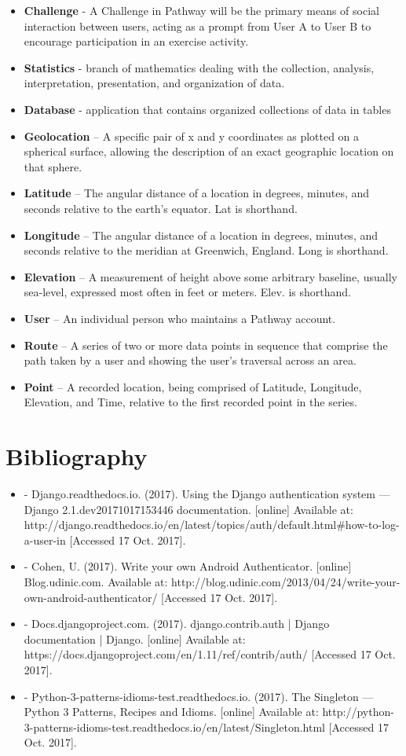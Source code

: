 \documentclass{article}
\begin{document}
\begin{itemize}
    \item \textbf{Challenge} - A Challenge in Pathway will be the primary means of social interaction between users, acting as a prompt from User A to User B to encourage participation in an exercise activity.
    \item \textbf{Statistics} - branch of mathematics dealing with the collection, analysis, interpretation, presentation, and organization of data.
    \item \textbf{Database} - application that contains organized collections of data in tables
    \item \textbf{Geolocation} – A specific pair of x and y coordinates as plotted on a spherical surface, allowing the description of an exact geographic location on that sphere.
    \item \textbf{Latitude} – The angular distance of a location in degrees, minutes, and seconds relative to the earth’s equator. Lat is shorthand.
    \item \textbf{Longitude} – The angular distance of a location in degrees, minutes, and seconds relative to the meridian at Greenwich, England. Long is shorthand.
    \item \textbf{Elevation} – A measurement of height above some arbitrary baseline, usually sea-level, expressed most often in feet or meters. Elev. is shorthand.
    \item \textbf{User} – An individual person who maintains a Pathway account.
    \item \textbf{Route} – A series of two or more data points in sequence that comprise the path taken by a user and showing the user’s traversal across an area.
    \item \textbf{Point} – A recorded location, being comprised of Latitude, Longitude, Elevation, and Time, relative to the first recorded point in the series.
\end{itemize}

\section{Bibliography}
\begin{itemize}
    \item -  Django.readthedocs.io. (2017). Using the Django authentication system — Django 2.1.dev20171017153446 documentation. [online] Available at: http://django.readthedocs.io/en/latest/topics/auth/default.html#how-to-log-a-user-in [Accessed 17 Oct. 2017].
    \item -  Cohen, U. (2017). Write your own Android Authenticator. [online] Blog.udinic.com. Available at: http://blog.udinic.com/2013/04/24/write-your-own-android-authenticator/ [Accessed 17 Oct. 2017].
    \item - Docs.djangoproject.com. (2017). django.contrib.auth | Django documentation | Django. [online] Available at: https://docs.djangoproject.com/en/1.11/ref/contrib/auth/ [Accessed 17 Oct. 2017].
    \item - Python-3-patterns-idioms-test.readthedocs.io. (2017). The Singleton — Python 3 Patterns, Recipes and Idioms. [online] Available at: http://python-3-patterns-idioms-test.readthedocs.io/en/latest/Singleton.html [Accessed 17 Oct. 2017].
\end{itemize}
\end{document}
